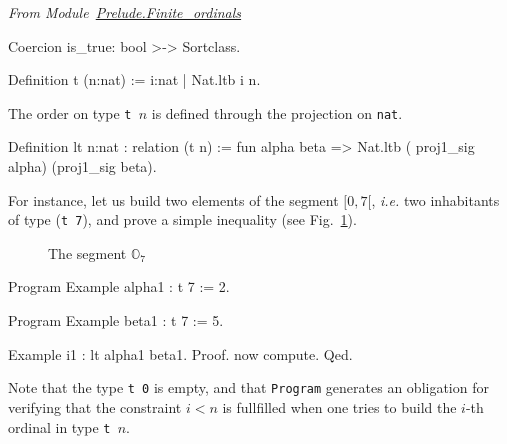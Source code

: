 \vspace{4pt}
\noindent\emph{From Module~\href{../src/html/hydras.Prelude.Finite_ordinals.html}{Prelude.Finite\_ordinals}}

\label{def: Finite-ord-type}
\begin{Coqsrc}
Coercion is_true: bool >-> Sortclass.

Definition t (n:nat) := {i:nat | Nat.ltb i  n}.
\end{Coqsrc}

The order on type \texttt{t $n$} is defined through the projection on \texttt{nat}.


\begin{Coqsrc}
Definition lt {n:nat} : relation (t n) :=
  fun alpha beta => Nat.ltb ( proj1_sig alpha) (proj1_sig beta).
\end{Coqsrc}

For instance, let us build two elements of the segment $[0, 7[$, \emph{i.e.} two
inhabitants of   type (\texttt{t 7}), and prove a simple  inequality (see Fig.~\ref{fig:O7}).

\begin{figure}[h]
\centering
{}

\caption{The segment $\mathbb{O}_7$\label{fig:O7}}
\end{figure}
  

\begin{Coqsrc}
Program Example alpha1 : t 7 := 2.

Program Example beta1 : t 7 := 5.

Example i1 : lt  alpha1 beta1.
Proof.   now compute. Qed.
\end{Coqsrc}




Note that the type \texttt{t 0} is empty, and that \texttt{Program} generates an obligation
for verifying that the constraint $i<n$ is fullfilled when one tries to build the $i$-th ordinal in type \texttt{t $n$}.


